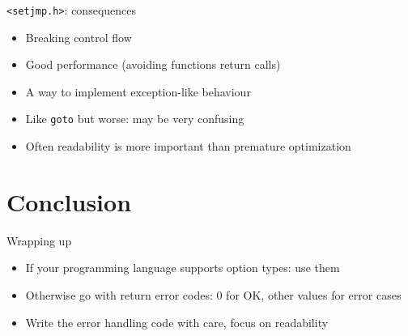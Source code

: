 \documentclass[aspectratio=169,14pt]{beamer}
\begin{document}
\begin{frame}{\texttt{<setjmp.h>}: consequences}
\begin{itemize}
    \item[\good] Breaking control flow
    \item[\good] Good performance (avoiding functions return calls)
    \item[\good] A way to implement exception-like behaviour
    \item[\bad] Like \texttt{goto} but worse: may be very confusing
    \item[\bad] Often readability is more important than premature optimization
\end{itemize}
\end{frame}





\section{Conclusion}

\begin{frame}{Wrapping up}
\begin{itemize}
    \item If your programming language supports option types: use them
    \item Otherwise go with return error codes: 0 for OK, other values for error cases
    \item Write the error handling code with care, focus on readability
\end{itemize}
\end{frame}
\end{document}
